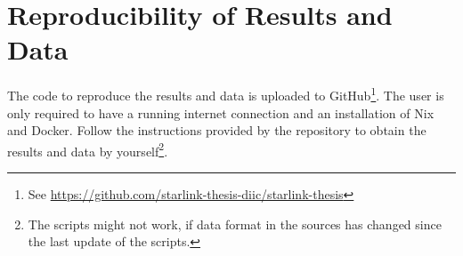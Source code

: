\section{Reproducibility of Results and Data} \label{sec:reproducibility}

The code to reproduce the results and data is uploaded to GitHub\footnote{See \url{https://github.com/starlink-thesis-diic/starlink-thesis}}. The user is only required to have a running internet connection and an installation of Nix and Docker. Follow the instructions provided by the repository to obtain the results and data by yourself\footnote{The scripts might not work, if data format in the sources has changed since the last update of the scripts.}.

